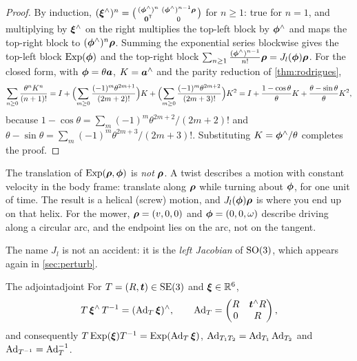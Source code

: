 \begin{proof}
By induction, $(\bm{\xi}^{\wedge})^n=\bigl(\begin{smallmatrix}
(\bm{\phi}^{\wedge})^n&(\bm{\phi}^{\wedge})^{n-1}\bm{\rho}\\\bm{0}^{\mathsf{T}}&0
\end{smallmatrix}\bigr)$ for $n\ge1$: true for $n=1$, and multiplying by
$\bm{\xi}^{\wedge}$ on the right multiplies the top-left block by
$\bm{\phi}^{\wedge}$ and maps the top-right block to $(\bm{\phi}^{\wedge})^n\bm{\rho}$.
Summing the exponential series blockwise gives the top-left block
$\operatorname{Exp}(\bm{\phi})$ and the top-right block
$\sum_{n\ge1}\frac{(\bm{\phi}^{\wedge})^{n-1}}{n!}\bm{\rho}=J_l(\bm{\phi})\bm{\rho}$. For
the closed form, with $\bm{\phi}=\theta\bm{a}$, $K=\bm{a}^{\wedge}$ and
the parity reduction of \cref{thm:rodrigues},
\[
\sum_{n\ge0}\frac{\theta^nK^n}{(n+1)!}=I+
\Bigl(\sum_{m\ge0}\frac{(-1)^m\theta^{2m+1}}{(2m+2)!}\Bigr)K+
\Bigl(\sum_{m\ge0}\frac{(-1)^m\theta^{2m+2}}{(2m+3)!}\Bigr)K^2
=I+\frac{1-\cos\theta}{\theta}K+\frac{\theta-\sin\theta}{\theta}K^2,
\]
because $1-\cos\theta=\sum_m(-1)^m\theta^{2m+2}/(2m+2)!$ and
$\theta-\sin\theta=\sum_m(-1)^m\theta^{2m+3}/(2m+3)!$. Substituting
$K=\bm{\phi}^{\wedge}/\theta$ completes the proof.
\end{proof}

\begin{inwords}
The translation of $\operatorname{Exp}(\bm{\rho},\bm{\phi})$ is \emph{not} $\bm{\rho}$. A twist
describes a motion with constant velocity in the body frame: translate
along $\bm{\rho}$ while turning about $\bm{\phi}$, for one unit of time. The
result is a helical (screw) motion, and $J_l(\bm{\phi})\bm{\rho}$ is where you
end up on that helix. For the mower, $\bm{\rho}=(v,0,0)$ and $\bm{\phi}=
(0,0,\omega)$ describe driving along a circular arc, and the endpoint lies
on the arc, not on the tangent.
\end{inwords}

The name $J_l$ is not an accident: it is the \emph{left Jacobian} of
$\mathrm{SO}(3)$, which appears again in \cref{sec:perturb}.

\begin{proposition}{The adjoint}{adjoint}
For $T=(R,\bm{t})\in\mathrm{SE}(3)$ and $\bm{\xi}\in\mathbb{R}^6$,
\[
T\,\bm{\xi}^{\wedge}\,T^{-1}=(\operatorname{Ad}_T\bm{\xi})^{\wedge},\qquad
\operatorname{Ad}_T=\begin{pmatrix}R&\bm{t}^{\wedge}R\\0&R\end{pmatrix},
\]
and consequently $T\operatorname{Exp}(\bm{\xi})T^{-1}=\operatorname{Exp}(\operatorname{Ad}_T\bm{\xi})$,
$\operatorname{Ad}_{T_1T_2}=\operatorname{Ad}_{T_1}\operatorname{Ad}_{T_2}$ and $\operatorname{Ad}_{T^{-1}}=\operatorname{Ad}_T^{-1}$.
\end{proposition}

